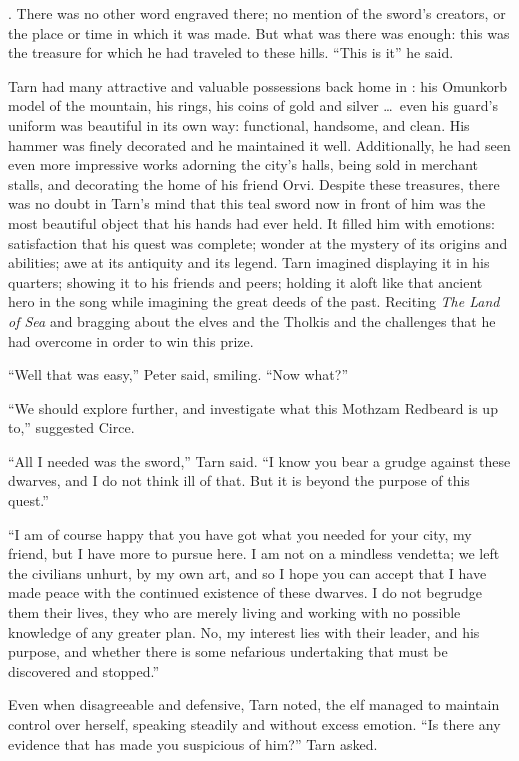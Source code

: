 
\emph{\kildir}.  There was no other word engraved there; no mention of the sword's creators, or the place or time in which it was made.  But what was there was enough: this was the treasure for which he had traveled to these hills.  ``This is it'' he said.

Tarn had many attractive and valuable possessions back home in \korbarthrond: his Omunkorb model of the mountain, his rings, his coins of gold and silver \ldots\ even his guard's uniform was beautiful in its own way: functional, handsome, and clean.  His hammer was finely decorated and he maintained it well.  Additionally, he had seen even more impressive works adorning the city's halls, being sold in merchant stalls, and decorating the home of his friend Orvi.  Despite these treasures, there was no doubt in Tarn's mind that this teal sword now in front of him was the most beautiful object that his hands had ever held.  It filled him with emotions: satisfaction that his quest was complete; wonder at the mystery of its origins and abilities; awe at its antiquity and its legend.  Tarn imagined displaying it in his quarters; showing it to his friends and peers; holding it aloft like that ancient hero in the song while imagining the great deeds of the past.  Reciting \emph{The Land of Sea} and bragging about the elves and the Tholkis and the challenges that he had overcome in order to win this prize.

``Well that was easy,'' Peter said, smiling.  ``Now what?''

``We should explore further, and investigate what this Mothzam Redbeard is up to,'' suggested Circe.

``All I needed was the sword,'' Tarn said.  ``I know you bear a grudge against these dwarves, and I do not think ill of that.  But it is beyond the purpose of this quest.''

``I am of course happy that you have got what you needed for your city, my friend, but I have more to pursue here.  I am not on a mindless vendetta; we left the civilians unhurt, by my own art, and so I hope you can accept that I have made peace with the continued existence of these dwarves.  I do not begrudge them their lives, they who are merely living and working with no possible knowledge of any greater plan.  No, my interest lies with their leader, and his purpose, and whether there is some nefarious undertaking that must be discovered and stopped.''

Even when disagreeable and defensive, Tarn noted, the elf managed to maintain control over herself, speaking steadily and without excess emotion. ``Is there any evidence that has made you suspicious of him?''  Tarn asked.

